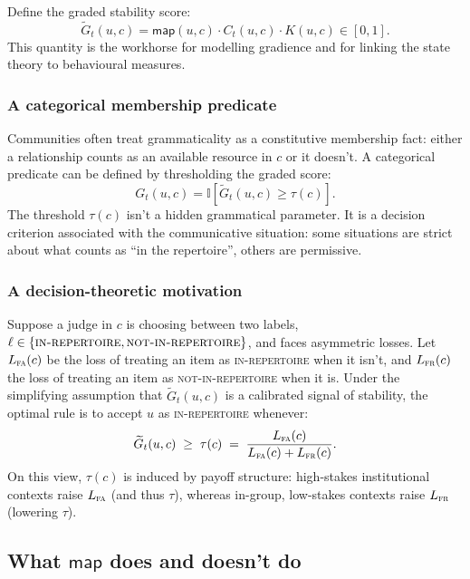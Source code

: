 \documentclass[12pt,letterpaper]{article}
\begin{document}
Define the graded stability score:
\begin{equation*}
\widetilde{G}_t(u,c)=\mathsf{map}(u,c)\cdot C_t(u,c)\cdot K(u,c)\in[0,1].
\end{equation*}
This quantity is the workhorse for modelling gradience and for linking the
state theory to behavioural measures.

\subsubsection{A categorical membership predicate}

Communities often treat grammaticality as a constitutive membership fact:
either a relationship counts as an available resource in $c$ or it doesn't.
A categorical predicate can be defined by thresholding the graded score:
\begin{equation*}
G_t(u,c)=\mathbb{I}\!\left[\widetilde{G}_t(u,c)\ge \tau(c)\right].
\end{equation*}
The threshold $\tau(c)$ isn't a hidden grammatical parameter. It is a decision
criterion associated with the communicative situation: some situations are
strict about what counts as \enquote{in the repertoire}, others are permissive.

\subsubsection{A decision-theoretic motivation}
Suppose a judge in $c$
is choosing between two labels, $\ell\in\{\textsc{in-repertoire},\textsc{not-in-repertoire}\}$,
and faces asymmetric losses. Let $L_{\textsc{fa}}(c)$ be the loss of treating an
item as \textsc{in-repertoire} when it isn't, and $L_{\textsc{fr}}(c)$ the loss
of treating an item as \textsc{not-in-repertoire} when it is. Under the
simplifying assumption that $\widetilde{G}_t(u,c)$ is a calibrated signal of
stability, the optimal rule is to accept $u$ as \textsc{in-repertoire} whenever:
\begin{equation*}
\widetilde{G}_t(u,c)\;\ge\;\tau(c)\;=\;\frac{L_{\textsc{fa}}(c)}{L_{\textsc{fa}}(c)+L_{\textsc{fr}}(c)}.
\end{equation*}
On this view, $\tau(c)$ is induced by payoff structure: high-stakes institutional
contexts raise $L_{\textsc{fa}}$ (and thus $\tau$), whereas in-group, low-stakes
contexts raise $L_{\textsc{fr}}$ (lowering $\tau$).

\subsection{What $\mathsf{map}$ does and doesn't do}
\label{sec:map-clarification}
\end{document}
